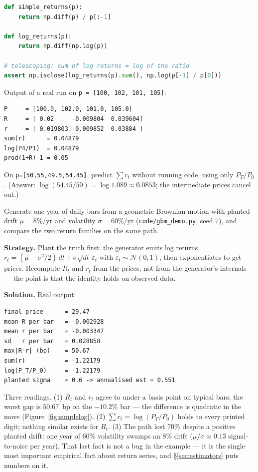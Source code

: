 \begin{lstlisting}[language=Python,caption={\texttt{code/returns.py} ---
the two definitions and the telescoping check.},label={lst:returns}]
def simple_returns(p):
    return np.diff(p) / p[:-1]

def log_returns(p):
    return np.diff(np.log(p))

# telescoping: sum of log returns = log of the ratio
assert np.isclose(log_returns(p).sum(), np.log(p[-1] / p[0]))
\end{lstlisting}

Output of a real run on \texttt{p = [100, 102, 101, 105]}:
\begin{lstlisting}[numbers=none]
P     = [100.0, 102.0, 101.0, 105.0]
R     = [ 0.02     -0.009804  0.039604]
r     = [ 0.019803 -0.009852  0.03884 ]
sum(r)      = 0.04879
log(P4/P1)  = 0.04879
prod(1+R)-1 = 0.05
\end{lstlisting}

\begin{checkpoint}
On \texttt{p=[50,55,49.5,54.45]}, predict $\sum r_t$ without running
code, using only $P_T/P_0$. (Answer: $\log(54.45/50)=\log 1.089
\approx 0.0853$; the intermediate prices cancel out.)
\end{checkpoint}

\begin{example}\label{ex:gbm}
Generate one year of daily bars from a geometric Brownian motion with
planted drift $\mu=8\%$/yr and volatility $\sigma=60\%$/yr
(\texttt{code/gbm\_demo.py}, seed 7), and compare the two return
families on the same path.

\textbf{Strategy.} Plant the truth first: the generator emits log
returns $r_t = (\mu-\sigma^2/2)\,dt + \sigma\sqrt{dt}\,\varepsilon_t$
with $\varepsilon_t\sim\mathcal N(0,1)$, then exponentiates to get
prices. Recompute $R_t$ and $r_t$ from the prices, not from the
generator's internals --- the point is that the identity holds on
observed data.

\textbf{Solution.} Real output:
\begin{lstlisting}[numbers=none]
final price      = 29.47
mean R per bar   = -0.002928
mean r per bar   = -0.003347
sd   r per bar   = 0.028858
max|R-r| (bp)    = 50.67
sum(r)           = -1.22179
log(P_T/P_0)     = -1.22179
planted sigma    = 0.6 -> annualised est = 0.551
\end{lstlisting}
Three readings. (1) $R_t$ and $r_t$ agree to under a basis point on
typical bars; the worst gap is $50.67$~bp on the $-10.2\%$ bar ---
the difference is quadratic in the move (Figure~\ref{fig:simplelog}).
(2) $\sum r_t = \log(P_T/P_0)$ holds to every printed digit; nothing
similar exists for $R_t$. (3) The path lost $70\%$ despite a positive
planted drift: one year of $60\%$ volatility swamps an $8\%$ drift
($\mu/\sigma \approx 0.13$ signal-to-noise per year). That last fact
is not a bug in the example --- it is the single most important
empirical fact about return series, and \S\ref{sec:estimators} puts
numbers on it.
\end{example}

